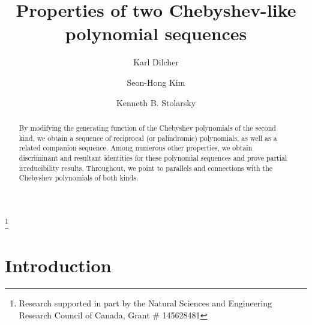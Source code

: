 \documentclass{amsart}
\theoremstyle{plain}
\numberwithin{equation}{section}
\begin{document}
\title[Chebyshev-like polynomial sequences]{Properties of two Chebyshev-like polynomial sequences}

\author{Karl Dilcher}
\address{Department of Mathematics and Statistics\\
         Dalhousie University\\
         Halifax, Nova Scotia, B3H 4R2, Canada}
%
\author{Seon-Hong Kim}
\address{Department of Mathematics and Research Institute of Natural Science\\
         Sookmyung Women’s University\\
         Seoul, 140-742 Korea}
%
\author{Kenneth B. Stolarsky}
\address{Department of Mathematics\\
         University of Illinois\\
         1409 West Green Street, Urbana, IL 61801, USA}
%
\thanks{Research supported in part by the Natural Sciences and Engineering
        Research Council of Canada, Grant \# 145628481}

\date{}

\setcounter{equation}{0}

\begin{abstract}
By modifying the generating function of the Chebyshev polynomials of the 
second kind, we obtain a sequence of reciprocal (or palindromic) polynomials,
as well as a related companion sequence. Among numerous other properties, we 
obtain discriminant and resultant identities for these polynomial sequences and
prove partial irreducibility results. Throughout, we point to parallels and
connections with the Chebyshev polynomials of both kinds.
\end{abstract}

\maketitle

\section{Introduction}\label{sec:1}
\end{document}
